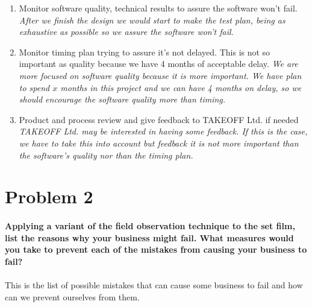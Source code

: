 \documentclass{article}
\begin{document}
\begin{enumerate}
\begin{enumerate}
\item Monitor software quality, technical results to assure the software won't fail. \textit{After we finish the design we would start to make the test plan, being as exhaustive as possible so we assure the software won't fail.}

\item Monitor timing plan trying to assure it's not delayed. This is not so important as quality because we have 4 months of acceptable delay. \textit{We are more focused on software quality because it is more important. We have plan to spend $x$ months in this project and we can have 4 months on delay, so we should encourage the software quality more than timing.}


\item Product and process review and give feedback to TAKEOFF Ltd. if needed \textit{TAKEOFF Ltd. may be interested in having some feedback. If this is the case, we have to take this into account but feedback it is not more important than the software's quality nor than the timing plan.}

\end{enumerate}

\newpage
\section{Problem 2}

\paragraph{Applying a variant of the field observation technique to the set film, list the reasons why your business might fail. What measures would you take to prevent each of the mistakes from causing your business to fail?}
\paragraph{}

This is the list of possible mistakes that can cause some business to fail and how can we prevent ourselves from them.


\end{enumerate}
\end{document}
